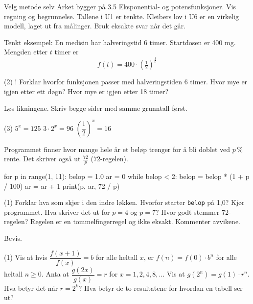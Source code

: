 
\begin{infoboks}{Velg metode selv}
Arket bygger på 3.5 Eksponential- og potensfunksjoner. Vis regning og begrunnelse.
Tallene i U1 er tenkte. Kleibers lov i U6 er en virkelig modell, laget ut fra målinger. Bruk eksakte svar når det går.
\end{infoboks}


Tenkt eksempel: En medisin har halveringstid 6 timer. Startdosen er 400 mg. Mengden etter $t$ timer er
\[ f(t) = 400 \cdot \left(\tfrac{1}{2}\right)^{\tfrac{t}{6}} \]
\begin{tasks}(2)
  \task! Forklar hvorfor funksjonen passer med halveringstiden 6 timer.
  \task Hvor mye er igjen etter ett døgn?
  \task Hvor mye er igjen etter 18 timer?
\end{tasks}

Løs likningene. Skriv begge sider med samme grunntall først.
\begin{tasks}(3)
  \task $5^x = 125$
  \task $3 \cdot 2^x = 96$
  \task $\left(\dfrac{1}{2}\right)^x = 16$
\end{tasks}

Programmet finner hvor mange hele år et beløp trenger for å bli doblet ved $p\,\%$ rente. Det skriver også ut $\frac{72}{p}$ (72-regelen).
\begin{kode}
for p in range(1, 11):
    belop = 1.0
    ar = 0
    while belop < 2:
        belop = belop * (1 + p / 100)
        ar = ar + 1
    print(p, ar, 72 / p)
\end{kode}
\begin{tasks}(1)
  \task Forklar hva som skjer i den indre løkken. Hvorfor starter \texttt{belop} på 1,0?
  \task Kjør programmet. Hva skriver det ut for $p = 4$ og $p = 7$?
  \task Hvor godt stemmer 72-regelen? Regelen er en tommelfingerregel og ikke eksakt. Kommenter avvikene.
\end{tasks}


Bevis.
\begin{tasks}(1)
  \task Vis at hvis $\dfrac{f(x+1)}{f(x)} = b$ for alle heltall $x$, er $f(n) = f(0) \cdot b^n$ for alle heltall $n \ge 0$.
  \task Anta at $\dfrac{g(2x)}{g(x)} = r$ for $x = 1, 2, 4, 8, \ldots$ Vis at $g(2^n) = g(1) \cdot r^n$. Hva betyr det når $r = 2^k$?
  \task Hva betyr de to resultatene for hvordan en tabell ser ut?
\end{tasks}

